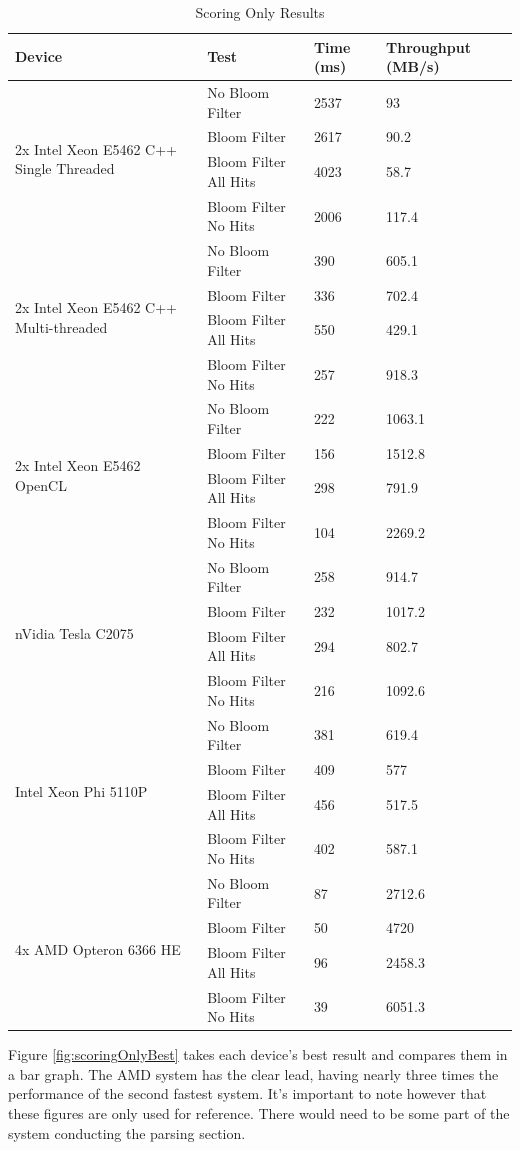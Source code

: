 \begin{table}[H]
\begin{tabular}{|l|l|l|l|}
\hline
Device & Test & Time (ms) & Throughput (MB/s)\\
\hline
\multirow{4}{*}{2x Intel Xeon E5462 C++ Single Threaded}
& No Bloom Filter & 2537 & 93 \\
& Bloom Filter & 2617 & 90.2 \\
& Bloom Filter All Hits & 4023 & 58.7 \\
& Bloom Filter No Hits & 2006 & 117.4 \\
\hline
\multirow{4}{*}{2x Intel Xeon E5462 C++ Multi-threaded}
& No Bloom Filter & 390 & 605.1 \\
& Bloom Filter & 336 & 702.4 \\
& Bloom Filter All Hits & 550 & 429.1 \\
& Bloom Filter No Hits & 257 & 918.3 \\
\hline
\multirow{4}{*}{2x Intel Xeon E5462 OpenCL}
& No Bloom Filter & 222 & 1063.1 \\
& Bloom Filter & 156 & 1512.8 \\
& Bloom Filter All Hits & 298 & 791.9 \\
& Bloom Filter No Hits & 104 & 2269.2 \\
\hline
\multirow{4}{*}{nVidia Tesla C2075}
& No Bloom Filter & 258 & 914.7 \\
& Bloom Filter & 232 & 1017.2 \\
& Bloom Filter All Hits & 294 & 802.7 \\
& Bloom Filter No Hits & 216 & 1092.6 \\
\hline
\multirow{4}{*}{Intel Xeon Phi 5110P}
& No Bloom Filter & 381 & 619.4 \\
& Bloom Filter & 409 & 577 \\
& Bloom Filter All Hits & 456 & 517.5 \\
& Bloom Filter No Hits & 402 & 587.1 \\
\hline
\multirow{4}{*}{4x AMD Opteron 6366 HE}
& No Bloom Filter & 87 & 2712.6 \\
& Bloom Filter & 50 & 4720 \\
& Bloom Filter All Hits & 96 & 2458.3 \\
& Bloom Filter No Hits & 39 & 6051.3 \\
\hline
\end{tabular}
\caption{Scoring Only Results}
\label{table:scoringOnly}
\end{table}

Figure \ref{fig:scoringOnlyBest} takes each device's best result and compares
them in a bar graph. The AMD system has the clear lead, having nearly three
times the performance of the second fastest system. It's important to note
however that these figures are only used for reference. There would need to
be some part of the system conducting the parsing section.

